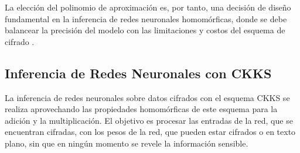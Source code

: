 La elección del polinomio de aproximación es, por tanto, una decisión de diseño fundamental en la inferencia de redes neuronales homomórficas, donde se debe balancear la precisión del modelo con las limitaciones y costos del esquema de cifrado \cite{Orion}.

\subsection{Inferencia de Redes Neuronales con CKKS}
La inferencia de redes neuronales sobre datos cifrados con el esquema CKKS se realiza aprovechando las propiedades homomórficas de este esquema para la adición y la multiplicación. El objetivo es procesar las entradas de la red, que se encuentran cifradas, con los pesos de la red, que pueden estar cifrados o en texto plano, sin que en ningún momento se revele la información sensible.

